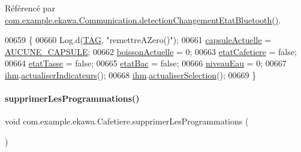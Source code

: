 Référencé par \hyperlink{_communication_8java_source_l00078}{com.\+example.\+ekawa.\+Communication.\+detection\+Changement\+Etat\+Bluetooth()}.


\begin{DoxyCode}
00659     \{
00660         Log.d(\hyperlink{classcom_1_1example_1_1ekawa_1_1_cafetiere_aa0c1fd99a2508b06c462aea17034aa91}{TAG}, \textcolor{stringliteral}{"remettreAZero()"});
00661         \hyperlink{classcom_1_1example_1_1ekawa_1_1_cafetiere_ac8fa3d1ad76eccf431ee04b395a557a3}{capsuleActuelle} = \hyperlink{classcom_1_1example_1_1ekawa_1_1_cafetiere_a5a23a636fa5f2e5826458e700f453c16}{AUCUNE\_CAPSULE};
00662         \hyperlink{classcom_1_1example_1_1ekawa_1_1_cafetiere_a73c5fa3b510655e1e3425140336b7f5b}{boissonActuelle} = 0;
00663         \hyperlink{classcom_1_1example_1_1ekawa_1_1_cafetiere_ae170dd018d1e740b3bda080d1cc3d900}{etatCafetiere} = \textcolor{keyword}{false};
00664         \hyperlink{classcom_1_1example_1_1ekawa_1_1_cafetiere_a93c5021591facf06397e760c11556904}{etatTasse} = \textcolor{keyword}{false};
00665         \hyperlink{classcom_1_1example_1_1ekawa_1_1_cafetiere_a058f7a18cd9c0567d583b8bc6250d143}{etatBac} = \textcolor{keyword}{false};
00666         \hyperlink{classcom_1_1example_1_1ekawa_1_1_cafetiere_aaf8e1a960f803c2de4defa414b5984a4}{niveauEau} = 0;
00667         \hyperlink{classcom_1_1example_1_1ekawa_1_1_cafetiere_a7db4a63088834eda5f6a3e951611bf82}{ihm}.\hyperlink{classcom_1_1example_1_1ekawa_1_1_ihm_a2c3740dd5be20b3111b36649514fd41e}{actualiserIndicateurs}();
00668         \hyperlink{classcom_1_1example_1_1ekawa_1_1_cafetiere_a7db4a63088834eda5f6a3e951611bf82}{ihm}.\hyperlink{classcom_1_1example_1_1ekawa_1_1_ihm_a2d7fd2fe397785acc2b9a32e65cfd52f}{actualiserSelection}();
00669     \}
\end{DoxyCode}
\mbox{\label{classcom_1_1example_1_1ekawa_1_1_cafetiere_a6d1bc4321c372f7639a3305cf74f10db}} 
\paragraph{\texorpdfstring{supprimer\+Les\+Programmations()}{supprimerLesProgrammations()}}
{\footnotesize\ttfamily void com.\+example.\+ekawa.\+Cafetiere.\+supprimer\+Les\+Programmations (\begin{DoxyParamCaption}{ }\end{DoxyParamCaption})\hspace{0.3cm}{\ttfamily [private]}}



